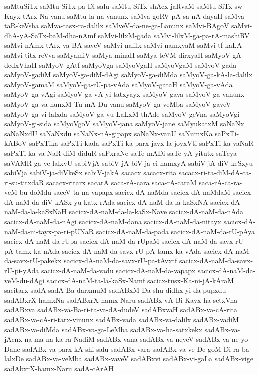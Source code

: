 {saMtuSiTx
saMtu-SiTx-pa-Di-salu
saMtu-SiTx-shAcx-jaRvaM
saMtu-SiTx-sw-Kayx-tArx-Na-vanu
saMtu-la-na-vanunx
saMva-goRV-pA-sa-nA-dayaH
saMva-taR-keVsha
saMva-tasx-ra-dalilx
saMveV-da-ne-ga-Lanunx
saMvi-BAgoV
saMvi-dhA-yA-SaTx-baM-dha-nAmf
saMvi-lilxM-gada
saMvi-lilxM-ga-pa-rA-mashiRV
saMvi-nAmx-tArx-va-BA-saveV
saMvi-nalilx
saMvi-namxyaM
saMvi-tf-kaLA
saMvi-titx-reVva
saMyamiV
saMya-minaH
saMya-teVM-dirxyaH
saMyoV-gA-dedxVhaH
saMyoV-gAtf
saMyoVga
saMyoVgaH
saMyoVgaM
saMyoV-gada
saMyoV-gadiM
saMyoV-ga-diM-dAgi
saMyoV-ga-diMda
saMyoV-ga-kA-la-dalilx
saMyoV-gamaM
saMyoV-ga-rU-pa-vAda
saMyoV-gataH
saMyoV-ga-vAda
saMyoV-ga-vAgi
saMyoV-ga-vA-yi-tatxyayx
saMyoV-gava
saMyoV-ga-vanunx
saMyoV-ga-va-nunxM-Tu-mA-Du-vanu
saMyoV-ga-veMba
saMyoV-gaveV
saMyoV-ga-vi-lalxda
saMyoV-ga-vu-LaLxM-thAde
saMyoV-geVna
saMyoVgi
saMyoV-gi-sida
saMyoVgoV
saMyoV-jana
saMyoV-jane
saMyukatxM
saNaNx
saNaNxdU
saNaNxdu
saNaNx-nA-gipapx
saNaNx-vanU
saNumxKa
saPxTi-kABoV
saPxTika
saPxTi-kada
saPxTi-ka-parx-javx-la-joyxVti
saPxTi-ka-vaNaR
saPxTi-ka-va-NaR-diM-diduR
saPxraNe
saTe-mADi
saTe-yA-yitutx
saTeya
saVAMR-ga-ve-lalxvU
sabiVjA
sabiV-jA-biV-ja-ci-namxyA
sabiV-jA-diV-keSxyu
sabiVja
sabiV-ja-diVkeSx
sabiV-jakA
sacacx
sacacx-rita
sacacx-ri-ta-diM-dA-ca-ri-su-titxdaR
sacacx-ritarx
sacarA
saca-rA-cara
saca-rA-caraM
saca-rA-ca-ra-veM-bu-doMdu
saceV-ta-na-vapapx
sacicx-dA-naMda
sacicx-dA-naMdaM
sacicx-dA-naM-da-diV-kASx-yu-katx-rAda
sacicx-dA-naM-da-la-kaSxNA
sacicx-dA-naM-da-la-kaSxNaH
sacicx-dA-naM-da-la-kaSx-Nave
sacicx-dA-naM-da-nAda
sacicx-dA-naM-da-nAgi
sacicx-dA-naM-dana
sacicx-dA-naM-da-nitayx
sacicx-dA-naM-da-ni-tayx-pa-ri-pUNaR
sacicx-dA-naM-da-pada
sacicx-dA-naM-da-rU-pAya
sacicx-dA-naM-da-rUpa
sacicx-dA-naM-da-rUpaM
sacicx-dA-naM-da-savx-rU-pA-tamx-ka-nAda
sacicx-dA-naM-da-savx-rU-pA-tamx-ka-vAda
sacicx-dA-naM-da-savx-rU-pakekx
sacicx-dA-naM-da-savx-rU-pa-tAvxtf
sacicx-dA-naM-da-savx-rU-pi-yAda
sacicx-dA-naM-da-vadu
sacicx-dA-naM-da-vapapx
sacicx-dA-naM-da-veM-du-dAgi
sacicx-dA-naM-ta-la-kaSx-Namf
sacicx-tusx-Ka-ni-jA-kAraM
sacitarx
sadA
sadA-Ba-darxmuM
sadABxM-Da-shu-didhx-yi-da-pupxdu
sadABxrX-hamxNa
sadABxrX-hamx-Naru
sadABx-vA-Bi-Kayx-ha-setxVna
sadABxva
sadABx-va-Ba-ri-ta-va-dA-dudeV
sadABxvaH
sadABx-va-cA-rita
sadABx-va-cA-ri-tarx-vinunx
sadABx-vada
sadABx-va-dalilx
sadABx-vadiM
sadABx-va-diMda
sadABx-va-ga-LeMba
sadABx-va-ha-satxkekx
sadABx-va-jAcnx-na-ma-na-ka-ra-NadiM
sadABx-vana
sadABx-va-neyeV
sadABx-va-ne-yo-Dane
sadABx-va-parx-kA-shi-salu
sadABx-vara
sadABx-va-ve-De-goM-Di-ra-ba-lalxDe
sadABx-va-veMba
sadABx-vaveV
sadABxvi
sadABx-vi-gaLa
sadABx-vige
sadAbxrX-hamx-Naru
sadA-cArAH
}

